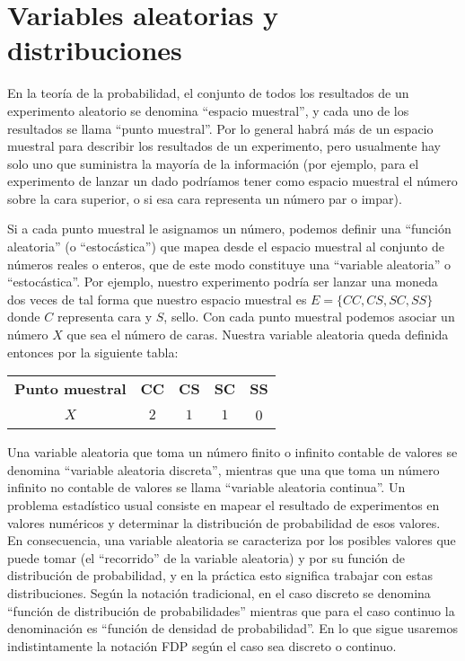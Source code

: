



\section{Variables aleatorias y distribuciones}


En la teoría de la probabilidad, el conjunto de todos los resultados de un experimento aleatorio se denomina ``espacio muestral'', y cada uno de los resultados se llama ``punto muestral''. Por lo general habrá más de un espacio muestral para describir los resultados de un experimento, pero usualmente hay solo uno que suministra la mayoría de la información (por ejemplo, para el experimento de lanzar un dado podríamos tener como espacio muestral el número sobre la cara superior, o si esa cara representa un número par o impar).

Si a cada punto muestral le asignamos un número, podemos definir una ``función aleatoria'' (o ``estocástica'') que mapea desde el espacio muestral al conjunto de números reales o enteros, que de este modo constituye una ``variable aleatoria'' o ``estocástica''. Por ejemplo, nuestro experimento podría ser lanzar una moneda dos veces de tal forma que nuestro espacio muestral es $E = \{CC, CS, SC, SS\}$ donde $C$ representa cara y $S$, sello. Con cada punto muestral podemos asociar un número $X$ que sea el número de caras. Nuestra variable aleatoria queda definida entonces por la siguiente tabla:

\begin{center}
 \begin{tabular} {ccccc}
 \toprule
  \textbf{Punto muestral} & \textbf{CC} & \textbf{CS} & \textbf{SC} & \textbf{SS} \\
  $X$ & $2$ & $1$ & $1$ & 0 \\
  \bottomrule
 \end{tabular}
\end{center}

Una variable aleatoria que toma un número finito o infinito contable de valores se denomina ``variable aleatoria discreta'', mientras que una que toma un número infinito no contable de valores se llama ``variable aleatoria continua''. Un problema estadístico usual consiste en mapear el resultado de experimentos en valores numéricos y determinar la distribución de probabilidad de esos valores. En consecuencia, una variable aleatoria se caracteriza por los posibles valores que puede tomar (el ``recorrido'' de la variable aleatoria) y por su función de distribución de probabilidad, y en la práctica esto significa trabajar con estas distribuciones. Según la notación tradicional, en el caso  discreto se denomina ``función de distribución de probabilidades'' mientras que para el caso continuo la denominación es ``función de densidad de probabilidad''. En lo que sigue usaremos indistintamente la notación FDP según el caso sea discreto o continuo.

